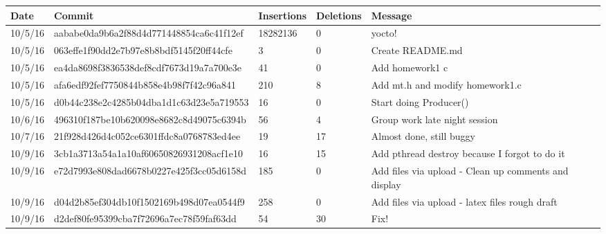 \documentclass[letterpaper,10pt,draftclsnofoot,titlepage,onecolumn]{IEEEtran}
\begin{document}
\begin{center}
\begin{tabular}{ |m{2cm}|m{5cm}|m{1cm}|m{1cm}|m{5cm}| }
 \hline
 Date & Commit & Insertions & Deletions & Message \\ [0.5ex] 
 \hline\hline
  10/5/16 & aababe0da9b6a2f88d4d771448854ca6c41f12ef & 18282136 & 0 & yocto! \\
 \hline
  10/5/16 & 063effe1f90dd2e7b97e8b8bdf5145f20ff44cfe & 3 & 0 & Create README.md \\
 \hline
  10/5/16 & ea4da8698f3836538def8cdf7673d19a7a700e3e & 41 & 0 & Add homework1 c \\
 \hline
  10/5/16 & afa6edf92fef7750844b858e4b98f7f42c96a841 & 210 & 8 & Add mt.h and modify homework1.c \\
 \hline
  10/5/16 & d0b44c238e2c4285b04dba1d1c63d23e5a719553 & 16 & 0 & Start doing Producer() \\
 \hline
  10/6/16 & 496310f187be10b620098e8682c8d49075c6394b & 56 & 4 & Group work late night session \\
 \hline
   10/7/16 & 21f928d426d4c052ce6301ffdc8a0768783ed4ee & 19 & 17 & Almost done, still buggy \\
 \hline
   10/9/16 & 3cb1a3713a54a1a10af60650826931208acf1e10 & 16 & 15 & Add pthread destroy because I forgot to do it \\
 \hline
   10/9/16 & e72d7993e808dad6678b0227e425f3cc05d6158d & 185 & 0 & Add files via upload - Clean up comments and display\\
 \hline
   10/9/16 & d04d2b85ef304db10f1502169b498d07ea0544f9 & 258 & 0 & Add files via upload - latex files rough draft\\
 \hline
   10/9/16 & d2def80fe95399cba7f72696a7ec78f59faf63dd & 54 & 30 & Fix!\\
 \hline
 
\end{tabular}
\end{center}
	
\clearpage
\end{document}
